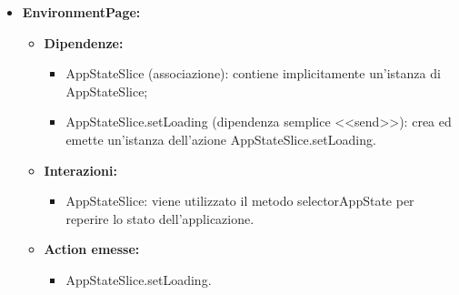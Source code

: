 \begin{itemize}
    \item \textbf{EnvironmentPage:}
          \begin{itemize}
              \item \textbf{Dipendenze:}
                    \begin{itemize}
                        \item AppStateSlice (associazione): contiene implicitamente un'istanza di
                              AppStateSlice;
                        \item AppStateSlice.setLoading (dipendenza semplice <<send>>): crea ed emette
                              un'istanza dell'azione AppStateSlice.setLoading.
                    \end{itemize}
              \item \textbf{Interazioni:}
                    \begin{itemize}
                        \item AppStateSlice: viene utilizzato il metodo selectorAppState per reperire lo
                              stato dell'applicazione.
                    \end{itemize}
              \item \textbf{Action emesse:}
                    \begin{itemize}
                        \item AppStateSlice.setLoading.
                    \end{itemize}
          \end{itemize}
\end{itemize}

